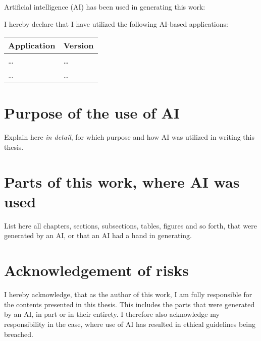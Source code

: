 Artificial intelligence (AI) has been used in generating this work:

\yestoai * %

I hereby declare that I have utilized the following AI-based applications:

\begin{center}
    \begin{tabularx}{\linewidth}{X|l}
        \toprule
        \textbf{Application} & \textbf{Version} \\
        \midrule
        \dots & \dots \\
        \dots & \dots \\
        \bottomrule
    \end{tabularx}
\end{center}

\section*{Purpose of the use of AI}

Explain here \emph{in detail}, for which purpose and how AI was utilized in writing this thesis.

\section*{Parts of this work,  where AI was used}

List here all chapters, sections, subsections, tables, figures and so forth,
that were generated by an AI, or that an AI had a hand in generating.

\section*{Acknowledgement of risks}

I hereby acknowledge, that as the author of this work, I am fully responsible
for the contents presented in this thesis. This includes the parts that were
generated by an AI, in part or in their entirety. I therefore also acknowledge
my responsibility in the case, where use of AI has resulted in ethical
guidelines being breached.
